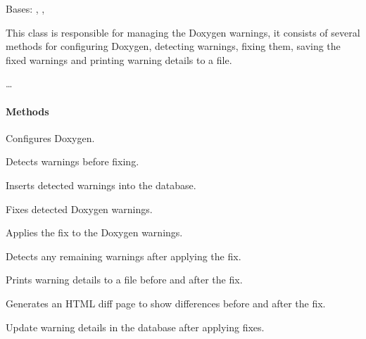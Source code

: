 \documentclass[letterpaper,10pt,english]{sphinxmanual}
\begin{document}
\begin{fulllineitems}
\label{\detokenize{main.ai_doxygen_cleaner:main.ai_doxygen_cleaner.ai_doxygen_cleaner.AIDoxygenCleaner}}
\pysigstartsignatures
{}
\pysigstopsignatures
\sphinxAtStartPar
Bases: , , 

\sphinxAtStartPar
This class is responsible for managing the Doxygen warnings, it consists of several methods
for configuring Doxygen, detecting warnings, fixing them, saving the fixed warnings and
printing warning details to a file.

\sphinxAtStartPar
…


\paragraph{Methods}
\label{\detokenize{main.ai_doxygen_cleaner:methods}}\begin{description}
\sphinxAtStartPar
Configures Doxygen.

\sphinxAtStartPar
Detects warnings before fixing.

\sphinxAtStartPar
Inserts detected warnings into the database.

\sphinxAtStartPar
Fixes detected Doxygen warnings.

\sphinxAtStartPar
Applies the fix to the Doxygen warnings.

\sphinxAtStartPar
Detects any remaining warnings after applying the fix.

\sphinxAtStartPar
Prints warning details to a file before and after the fix.

\sphinxAtStartPar
Generates an HTML diff page to show differences before and after the fix.

\sphinxAtStartPar
Update warning details in the database after applying fixes.


\end{description}
\end{fulllineitems}
\end{document}
